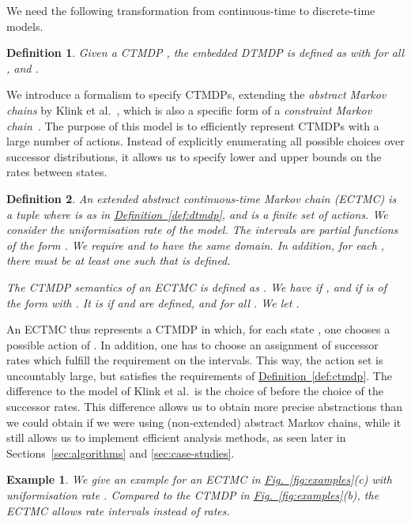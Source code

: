 \documentclass[10pt,twocolumn]{article}
\newtheorem{definition}{Definition}
\newtheorem{example}{Example}
\newcommand{\refdef}[1]{\texorpdfstring{\hyperref[def:#1]{Definition~\ref*{def:#1}}}{Definition \ref*{def:#1}}}
\newcommand{\reffig}[1]{\texorpdfstring{\hyperref[fig:#1]{Fig.~\ref*{fig:#1}}}{Fig.~\ref*{fig:#1}}}
\begin{document}
We need the following transformation from continuous-time to discrete-time models.
\begin{definition}
  \label{def:emb}
Given a CTMDP , the \emph{embedded DTMDP} is defined as
   with 
  for all , and .
\end{definition}

We introduce a formalism to specify CTMDPs, extending the \emph{abstract Markov chains} by Klink et al.~\cite{Klink10,KatoenKLW07,KozineU02}, which is also a specific form of a \emph{constraint Markov chain}~\cite{CaillaudDLLPW10}.
The purpose of this model is to efficiently represent CTMDPs with a large number of actions.
Instead of explicitly enumerating all possible choices over successor distributions, it allows us to specify lower and upper bounds on the rates between states.
\begin{definition}
  \label{def:imc}
An \emph{extended abstract continuous-time Markov chain (ECTMC)} is a tuple 
   where  is 
  as in \refdef{dtmdp}, and  is a finite set of actions.
  We consider the uniformisation rate  of the model.
  The \emph{intervals} are partial functions of the form 
  .
  We require  and  to have the same domain.
  In addition, for each , there must be at least 
  one  such that  is defined.

  The \emph{CTMDP semantics} of an ECTMC is defined as .
  We have  if , and if  is of the form  with .
  It is  if  and  are defined,
  and  for all .
  We let .
\end{definition}
An ECTMC thus represents a CTMDP in which, for each state , one chooses a possible action  of .
In addition, one has to choose an assignment of successor rates which fulfill the requirement on the intervals.
This way, the action set is uncountably large, but satisfies the requirements of \refdef{ctmdp}.
The difference to the model of Klink et al.~is the choice of  before the choice of the successor rates.
This difference allows us to obtain more precise abstractions than we could obtain if we were using (non-extended) abstract Markov chains, while 
it still allows us to implement efficient analysis methods, as seen later in Sections~\ref{sec:algorithms} and \ref{sec:case-studies}.
\begin{example}
  \label{exa:ectmc}
We give an example for an ECTMC in \reffig{examples}(c) with uniformisation rate . Compared to the
  CTMDP in \reffig{examples}(b), the ECTMC allows rate intervals instead of rates.
\end{example}
\end{document}
